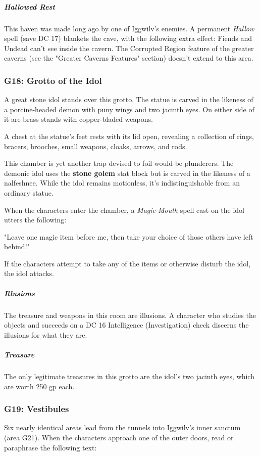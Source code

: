 \documentclass[10pt,a4paper,twoside,bg=print,twocolumn,openany,nodeprecatedcode]{dndbook}
\begin{document}
\subparagraph{Hallowed Rest}
This haven was made long ago by one of Iggwilv's enemies. A permanent \textit{Hallow} spell (save DC 17) blankets the cave, with the following extra effect: Fiends and Undead can't see inside the cavern. The Corrupted Region feature of the greater caverns (see the "Greater Caverns Features" section) doesn't extend to this area.

\subsubsection{G18: Grotto of the Idol}
\begin{DndReadAloud}{}
A great stone idol stands over this grotto. The statue is carved in the likeness of a porcine-headed demon with puny wings and two jacinth eyes. On either side of it are brass stands with copper-bladed weapons.

A chest at the statue's feet rests with its lid open, revealing a collection of rings, bracers, brooches, small weapons, cloaks, arrows, and rods.

\end{DndReadAloud}

This chamber is yet another trap devised to foil would-be plunderers. The demonic idol uses the \textbf{stone golem} stat block but is carved in the likeness of a nalfeshnee. While the idol remains motionless, it's indistinguishable from an ordinary statue.

When the characters enter the chamber, a \textit{Magic Mouth} spell cast on the idol utters the following:

\begin{DndReadAloud}{}
"Leave one magic item before me, then take your choice of those others have left behind!"

\end{DndReadAloud}

If the characters attempt to take any of the items or otherwise disturb the idol, the idol attacks.

\subparagraph{Illusions}
The treasure and weapons in this room are illusions. A character who studies the objects and succeeds on a DC 16 Intelligence (Investigation) check discerns the illusions for what they are.

\subparagraph{Treasure}
The only legitimate treasures in this grotto are the idol's two jacinth eyes, which are worth 250 gp each.

\subsubsection{G19: Vestibules}
Six nearly identical areas lead from the tunnels into Iggwilv's inner sanctum (area G21). When the characters approach one of the outer doors, read or paraphrase the following text:
\end{document}
